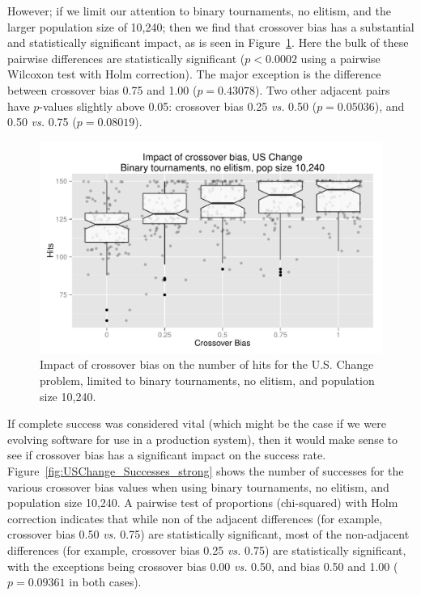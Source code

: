 \documentclass{sig-alternate}
\begin{document}
However; if we limit our attention to binary tournaments, no elitism, and the larger population size of 10,240; then we
find that crossover bias has a substantial and statistically significant impact, as is seen in
Figure~\ref{fig:USChange_Hits_strong}. Here the bulk of these pairwise differences are statistically significant
($p<0.0002$ using a pairwise Wilcoxon test with Holm correction). The major exception is the difference between
crossover bias 0.75 and 1.00 ($p=0.43078$). Two other adjacent pairs have $p$-values slightly above 0.05: crossover bias
0.25 \emph{vs.} 0.50 ($p=0.05036$), and 0.50 \emph{vs.} 0.75 ($p=0.08019$).

\begin{figure}
\centering
\includegraphics[width=0.45 \textwidth]{Plots/US_change_hits_strong.pdf}
\caption{Impact of crossover bias on the number of hits for the U.S. Change problem, limited to binary 
tournaments, no elitism, and population size 10,240.}
\label{fig:USChange_Hits_strong}
\end{figure}

%
%
%
%

If complete success was considered vital (which might be the case if we were evolving software for use in a production
system), then it would make sense to see if crossover bias has a significant impact on the success rate.
Figure~\ref{fig:USChange_Successes_strong} shows the number of successes for the various crossover bias values when
using binary tournaments, no elitism, and population size 10,240. A pairwise test of proportions (chi-squared) with
Holm correction indicates that while non of the adjacent differences (for example, crossover bias 0.50 \emph{vs.} 0.75)
are statistically significant, most of the non-adjacent differences (for example, crossover bias 0.25 \emph{vs.} 0.75)
are statistically significant, with the exceptions being crossover bias 0.00 \emph{vs.} 0.50, and bias 0.50 and 1.00
($p=0.09361$ in both cases).
\end{document}
